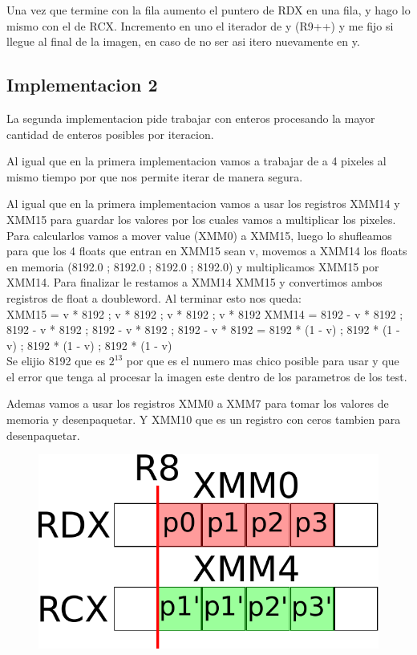 Una vez que termine con la fila aumento el puntero de RDX en una fila, y hago lo mismo con el de RCX. Incremento en uno el iterador de y (R9++) y me fijo si llegue al final de la imagen, en caso de no ser asi itero nuevamente en y. \\

\subsection{Implementacion 2}
La segunda implementacion pide trabajar con enteros procesando la mayor cantidad de enteros posibles por iteracion.

Al igual que en la primera implementacion vamos a trabajar de a 4 pixeles al mismo tiempo por que nos permite iterar de manera segura.

Al igual que en la primera implementacion vamos a usar los registros XMM14 y XMM15 para guardar los valores por los cuales vamos a multiplicar los pixeles. Para calcularlos vamos a mover value (XMM0) a XMM15, luego lo shufleamos para que los 4 floats que entran en XMM15 sean v, movemos a XMM14 los floats en memoria (8192.0 ; 8192.0 ; 8192.0 ; 8192.0) y multiplicamos XMM15 por XMM14. Para finalizar le restamos a XMM14 XMM15 y convertimos ambos registros de float a doubleword. Al terminar esto nos queda: \\
	XMM15 = v * 8192 ; v * 8192 ; v * 8192 ; v * 8192
	XMM14 = 8192 - v * 8192 ; 8192 - v * 8192 ; 8192 - v * 8192 ; 8192 - v * 8192 = 8192 * (1 - v) ; 8192 * (1 - v) ; 8192 * (1 - v) ; 8192 * (1 - v) \\
Se elijio 8192 que es $2^{13}$ por que es el numero mas chico posible para usar y que el error que tenga al procesar la imagen este dentro de los parametros de los test.

Ademas vamos a usar los registros XMM0 a XMM7 para tomar los valores de memoria y desenpaquetar. Y XMM10 que es un registro con ceros tambien para desenpaquetar.

\begin{figure}[h!]
	\centering
	\includegraphics[scale=0.5]{images/MergeASM2_0}
\end{figure}


